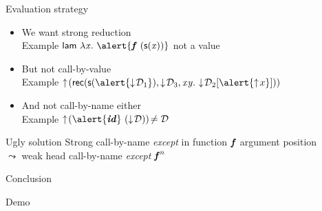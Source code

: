 \begin{frame}{Evaluation strategy}
  \begin{itemize}[<+->]
  \item We want strong reduction\\
    \textcolor{greenish}{Example}\quad
    $\cst{lam}\ \lam x \alert{\fct{f}\ (\s {\var x})} $
    {\footnotesize not a value}
  \item But not call-by-value\\
    \textcolor{greenish}{Example}\quad
    $\finfer{(\recb{\s{\alert{\fget\md_1}}}{\fget\md_3} x y {\fget{\md_2[\alert{\finfer{x}}]}})}$
  \item And not call-by-name either \\
    \textcolor{greenish}{Example}\quad
    $\finfer{(\alert{\fct{id}}\ (\fget{\md}))}${\footnotesize$\neq\mathcal D$}
  \end{itemize}
  \pause
  \begin{block}{Ugly solution}
    Strong call-by-name \emph{except} in function $\text{\textit{\textbf{f}}}$ argument position\\
    \qquad$\leadsto$ weak head call-by-name \emph{except} $\text{\textit{\textbf{f}}}^{n}$
  \end{block}
\end{frame}

\begin{frame}{Conclusion}
  \begin{center}
    \huge Demo
  \end{center}
\end{frame}

